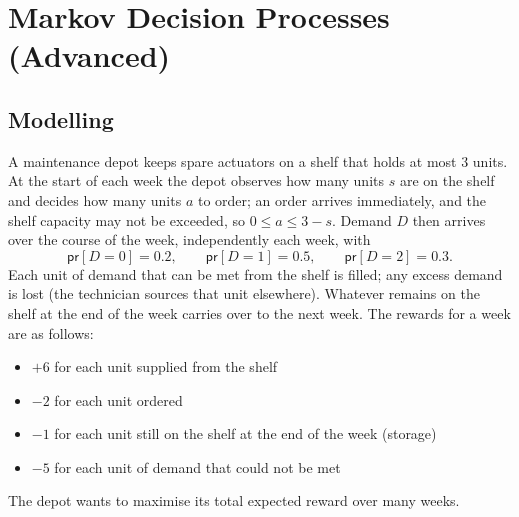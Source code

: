 \section{\points[8] Markov Decision Processes (Advanced)}
\subsection{\points[8] Modelling}
A maintenance depot keeps spare actuators on a shelf that holds at most $3$ units.
At the start of each week the depot observes how many units $s$ are on the shelf and decides
how many units $a$ to order; an order arrives immediately, and the shelf capacity may not be
exceeded, so $0 \le a \le 3-s$.
\medskip\noindent
Demand $D$ then arrives over the course of the week, independently each week, with
\[
\textsf{pr}[D=0]=0.2, \qquad \textsf{pr}[D=1]=0.5, \qquad \textsf{pr}[D=2]=0.3.
\]
Each unit of demand that can be met from the shelf is filled; any excess demand is lost (the
technician sources that unit elsewhere). Whatever remains on the shelf at the end of the week
carries over to the next week.
\medskip\noindent
The rewards for a week are as follows:
\begin{itemize}
  \item $+6$ for each unit supplied from the shelf
  \item $-2$ for each unit ordered
  \item $-1$ for each unit still on the shelf at the end of the week (storage)
  \item $-5$ for each unit of demand that could not be met
\end{itemize}
\medskip\noindent
The depot wants to maximise its total expected reward over many weeks.
